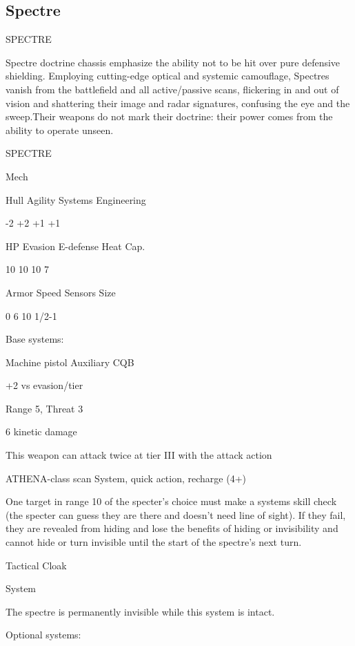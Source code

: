 \subsection{Spectre}

                                               SPECTRE  

Spectre doctrine chassis emphasize the ability not to be hit over pure defensive shielding.  
Employing cutting-edge optical and systemic camouflage, Spectres vanish from the battlefield  
and all active/passive scans, flickering in and out of vision and shattering their image and radar  
signatures, confusing the eye and the sweep.Their weapons do not mark their doctrine: their  
power comes from the ability to operate unseen. 
 

 SPECTRE 

 Mech 

 Hull       Agility      Systems       Engineering 

 -2         +2           +1            +1 

 HP         Evasion      E-defense     Heat Cap. 

 10         10           10            7 

 Armor      Speed        Sensors       Size 

 0          6            10            1/2-1 

Base systems:  

Machine pistol  
Auxiliary CQB
 
+2 vs evasion/tier
 
Range 5, Threat 3
 
6 kinetic damage
 
This weapon can attack twice at tier III with the attack action
 

ATHENA-class scan  
System, quick action, recharge (4+)
 
One target in range 10 of the specter’s choice must make a systems skill check (the specter can  
guess they are there and doesn’t need line of sight). If they fail, they are revealed from hiding and  
lose the benefits of hiding or invisibility and cannot hide or turn invisible until the start of the  
spectre’s next turn.
 

Tactical Cloak
 
System
 
The spectre is permanently invisible while this system is intact.
 

Optional systems:  

                                                                                                          


